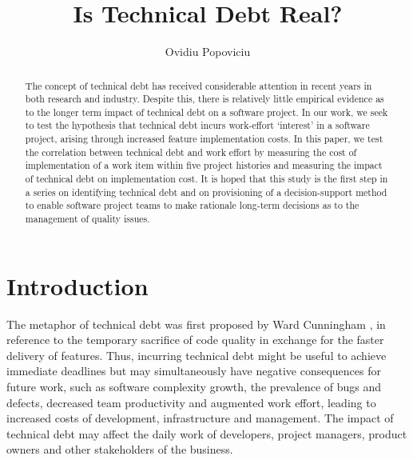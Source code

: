 \documentclass{mpaper}
\begin{document}
\title{Is Technical Debt Real?}
\author{Ovidiu Popoviciu}


\maketitle


\begin{abstract}
The concept of technical debt has received considerable attention in recent
years in both research and industry. Despite this, there is relatively little
empirical evidence as to the longer term impact of technical debt on a software
project. In our work, we seek to test the hypothesis that technical debt incurs
work-effort `interest' in a software project, arising through increased feature
implementation costs. In this paper, we test the correlation between technical
debt and work effort by measuring the cost of implementation of a work item
within five project histories and measuring the impact of technical debt on
implementation cost. It is hoped that this study is the first step in a series
on identifying technical debt and on provisioning of a decision-support method
to enable software project teams to make rationale long-term decisions as to the
management of quality issues. 
\end{abstract}

\section{Introduction}
\label{introduction}

The metaphor of technical debt was first proposed by Ward Cunningham
\cite{Cunningham1993}, in reference to the temporary sacrifice of code quality
in exchange for the faster delivery of features. Thus, incurring technical debt
might be useful to achieve immediate deadlines but may simultaneously have
negative consequences for future work, such as software complexity growth, the
prevalence of bugs and defects, decreased team productivity and augmented work
effort, leading to increased costs of development, infrastructure and
management. The impact of technical debt may affect the daily work of
developers, project managers, product owners and other stakeholders of the
business.
\end{document}
